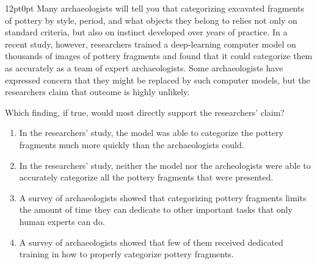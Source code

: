 \documentclass[11pt, twocolumn]{article}
\newcounter{questionnum}
\begin{document}
\vspace{6pt}\noindent
\begin{minipage}{\columnwidth}\raggedright
\noindent{}\par\vspace{8pt}
\begin{adjustwidth}{12pt}{0pt}
Many archaeologists will tell you that categorizing excavated fragments of pottery by style, period, and what objects they belong to relies not only on standard criteria, but also on instinct developed over years of practice. In a recent study, however, researchers trained a deep-learning computer model on thousands of images of pottery fragments and found that it could categorize them as accurately as a team of expert archaeologists. Some archaeologists have expressed concern that they might be replaced by such computer models, but the researchers claim that outcome is highly unlikely.
\vspace{6pt}

Which finding, if true, would most directly support the researchers' claim?
\begin{enumerate}[label=\Alph*),leftmargin=18pt,topsep=3pt,itemsep=2pt]
  \item In the researchers' study, the model was able to categorize the pottery fragments much more quickly than the archaeologists could.
  \item In the researchers' study, neither the model nor the archeologists were able to accurately categorize all the pottery fragments that were presented.
  \item A survey of archaeologists showed that categorizing pottery fragments limits the amount of time they can dedicate to other important tasks that only human experts can do.
  \item A survey of archaeologists showed that few of them received dedicated training in how to properly categorize pottery fragments.
\end{enumerate}
\end{adjustwidth}
\end{minipage}\par
\end{document}
